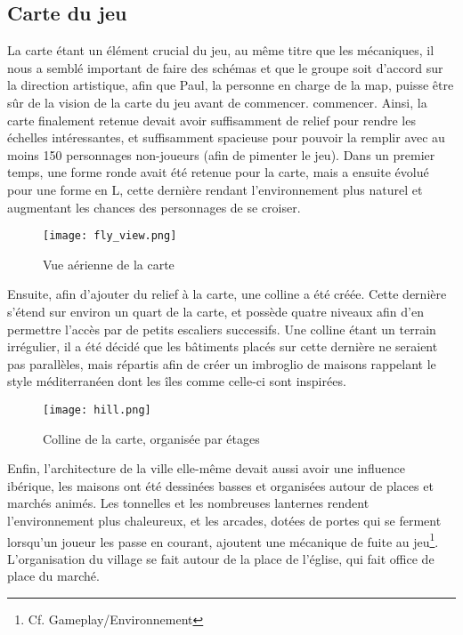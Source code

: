 \subsection{Carte du jeu}

La carte étant un élément crucial du jeu, au même titre que les mécaniques, 
il nous a semblé important de faire des schémas et que le groupe soit d'accord sur la direction artistique,
afin que Paul, la personne en charge de la map, puisse être sûr de la vision de la carte du jeu avant de commencer.
commencer. Ainsi, la carte finalement retenue devait avoir suffisamment de 
relief pour rendre les échelles intéressantes, et suffisamment spacieuse pour 
pouvoir la remplir avec au moins 150 personnages non-joueurs (afin de pimenter le jeu).
Dans un premier temps, une forme ronde avait été retenue pour la carte, mais 
a ensuite évolué pour une forme en L, cette dernière rendant l’environnement 
plus naturel et augmentant les chances des personnages de se croiser.


\begin{figure}[hbt!]
    \centering
    \texttt{[image: fly\_view.png]}
    \caption{Vue aérienne de la carte}
\end{figure}

Ensuite, afin d’ajouter du relief à la carte, une colline a été créée. 
Cette dernière s’étend sur environ un quart de la carte, et possède quatre 
niveaux afin d’en permettre l’accès par de petits escaliers successifs. 
Une colline étant un terrain irrégulier, il a été décidé que les bâtiments 
placés sur cette dernière ne seraient pas parallèles, mais répartis afin de 
créer un imbroglio de maisons rappelant le style méditerranéen dont les îles 
comme celle-ci sont inspirées.


\begin{figure}[hbt!]
    \centering
    \texttt{[image: hill.png]}
    \caption{Colline de la carte, organisée par étages}
\end{figure}


Enfin, l’architecture de la ville elle-même devait aussi avoir une influence 
ibérique, les maisons ont été dessinées basses et organisées autour de places et 
marchés animés. Les tonnelles et les nombreuses lanternes rendent l’environnement 
plus chaleureux, et les arcades, dotées de portes qui se ferment lorsqu’un joueur 
les passe en courant, ajoutent une mécanique de fuite au jeu\footnote{Cf. Gameplay/Environnement}. L’organisation du 
village se fait autour de la place de l’église, qui fait office de place du marché.\\